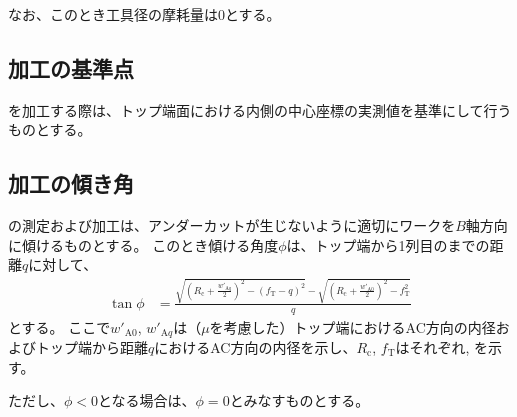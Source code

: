なお、このとき工具径の摩耗量は0とする。


\subsection{\Dimple 加工の基準点}
\Dimple を加工する際は、トップ端面における内側の中心座標の実測値を基準にして行うものとする。


\subsection{\Dimple 加工の傾き角}
\Dimple の測定および加工は、アンダーカットが生じないように適切にワークを$B$軸方向に傾けるものとする。
このとき傾ける角度$\phi$は、トップ端から1列目の\nameDimple までの距離$q$に対して、
\begin{align*}
  \tan\phi
  &= \frac{\displaystyle
           \sqrt{\left(R_\mathrm c+\frac{w'_{\mathrm Aq}}2\right)^2-(f_\mathrm T-q)^2}
           -\sqrt{\left(R_\mathrm c+\frac{w'_{\mathrm A0}}2\right)^2-f_\mathrm T^2}}q
\end{align*}
とする。
ここで$w'_{\mathrm A0}$, $w'_{\mathrm Aq}$は（\PlatingThk$\mu$を考慮した）トップ端におけるAC方向の内径およびトップ端から距離$q$におけるAC方向の内径を示し、$R_\mathrm c$, $f_\mathrm T$はそれぞれ\CenterCurvatureRadius, \TopAlocationLength を示す。

ただし、$\phi < 0$となる場合は、$\phi = 0$とみなすものとする。



